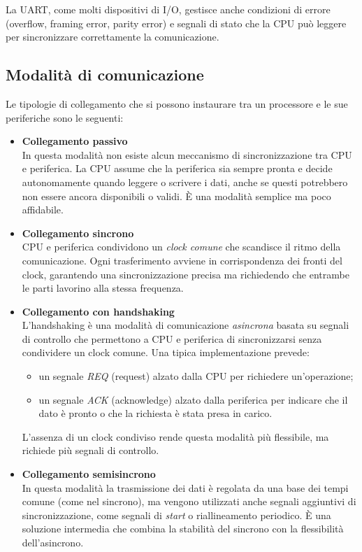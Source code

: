 La UART, come molti dispositivi di I/O, gestisce anche condizioni di errore (overflow, framing error, parity error) 
e segnali di stato che la CPU può leggere per sincronizzare correttamente la comunicazione.




\subsection{Modalità di comunicazione}

Le tipologie di collegamento che si possono instaurare tra un processore e le sue periferiche sono le seguenti:

\begin{itemize}

    \item \textbf{Collegamento passivo}\\
    In questa modalità non esiste alcun meccanismo di sincronizzazione tra CPU e periferica. 
    La CPU assume che la periferica sia sempre pronta e decide autonomamente quando leggere o scrivere i dati, 
    anche se questi potrebbero non essere ancora disponibili o validi. È una modalità semplice ma poco affidabile.

    \item \textbf{Collegamento sincrono}\\
    CPU e periferica condividono un \emph{clock comune} che scandisce il ritmo della comunicazione. 
    Ogni trasferimento avviene in corrispondenza dei fronti del clock, garantendo una sincronizzazione precisa 
    ma richiedendo che entrambe le parti lavorino alla stessa frequenza.

    \item \textbf{Collegamento con handshaking}\\
    L'handshaking è una modalità di comunicazione \emph{asincrona} basata su segnali di controllo che permettono 
    a CPU e periferica di sincronizzarsi senza condividere un clock comune.  
    Una tipica implementazione prevede:
    \begin{itemize}
        \item un segnale \textit{REQ} (request) alzato dalla CPU per richiedere un'operazione;
        \item un segnale \textit{ACK} (acknowledge) alzato dalla periferica per indicare che il dato è pronto 
        o che la richiesta è stata presa in carico.
    \end{itemize}
    L'assenza di un clock condiviso rende questa modalità più flessibile, ma richiede più segnali di controllo.

    \item \textbf{Collegamento semisincrono}\\
    In questa modalità la trasmissione dei dati è regolata da una base dei tempi comune (come nel sincrono), 
    ma vengono utilizzati anche segnali aggiuntivi di sincronizzazione, come segnali di \emph{start} o 
    riallineamento periodico.  
    È una soluzione intermedia che combina la stabilità del sincrono con la flessibilità dell'asincrono.
    
\end{itemize}


